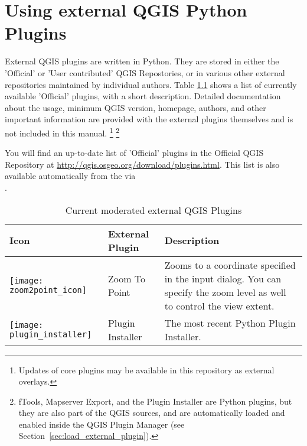 
\chapter{Using external QGIS Python Plugins}\label{sec:external_plugins}


External QGIS plugins are written in Python. They are stored in either 
the 'Official' or 'User contributed' QGIS Repostories, or in various other external 
repositories maintained by individual authors. 
Table \ref{tab:external_plugins} shows a list of currently available 'Official' 
plugins, with a short description.
Detailed documentation about the usage, minimum QGIS version, homepage, authors, 
and other important information are provided with the external plugins themselves 
and is not included in this manual.
\footnote{Updates of core plugins may be 
available in this repository as external overlays.} 
\footnote{fTools, Mapserver Export, and the Plugin Installer are Python plugins, 
but they are also part of the QGIS sources, and are automatically loaded and 
enabled inside the QGIS Plugin Manager (see Section~\ref{sec:load_external_plugin}).}


You will find an up-to-date list of 'Official' plugins in the Official QGIS 
Repository at \url{http://qgis.osgeo.org/download/plugins.html}. This list is 
also available automatically from the  
via \\ 
.

\begin{table}[H]
\centering
 \begin{tabular}{|l|l|p{8cm}|}
\hline \textbf{Icon} & \textbf{External Plugin} & \textbf{Description}\\
\hline
\texttt{[image: zoom2point\_icon]}
 & Zoom To Point \index{plugins!Zoom To Point} & Zooms to a coordinate 
  specified in the input dialog. You can specify the zoom level as well to 
  control the view extent.\\
\hline
\texttt{[image: plugin\_installer]}
 & Plugin Installer \index{plugins!Plugin Installer} & The most recent Python Plugin Installer.\\
\hline
\end{tabular}
\caption{Current moderated external QGIS Plugins}\label{tab:external_plugins}
\end{table}

